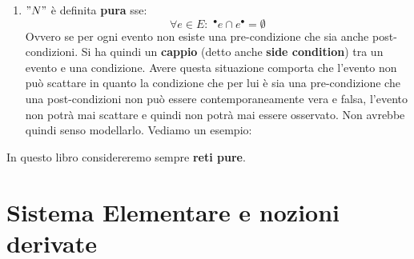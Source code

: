 \begin{definizione}
\begin{enumerate}
\begin{center}
    \end{center}
    \item $"N"$ è definita \textbf{pura} sse:
    \[\forall e \in E:\,\,^\bullet e \cap e^\bullet = \emptyset\]
    Ovvero se per ogni evento non esiste una pre-condizione che sia anche
    post-condizioni. Si ha quindi un \textbf{cappio} (detto anche \textbf{side
      condition}) tra un evento e una condizione. Avere questa situazione
    comporta che l'evento non può scattare in quanto la condizione che per lui è
    sia una pre-condizione che una post-condizioni non può essere
    contemporaneamente vera e falsa, l'evento non potrà mai scattare e quindi
    non potrà mai essere osservato. Non avrebbe quindi senso modellarlo. Vediamo
    un esempio:
    \begin{center}
  \end{center}
    
  \end{enumerate}
\end{definizione} \vspace{5mm} %
\begin{nota}
In questo libro considereremo sempre \textbf{reti pure}.
\end{nota}
\section{Sistema Elementare e nozioni derivate}
